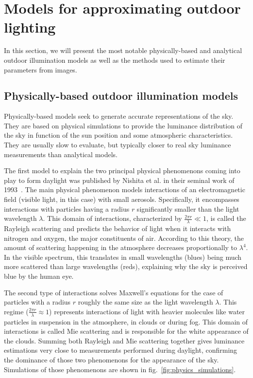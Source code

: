 

\section{Models for approximating outdoor lighting}

In this section, we will present the most notable physically-based and analytical outdoor illumination models as well as the methods used to estimate their parameters from images.


\subsection{Physically-based outdoor illumination models}

Physically-based models seek to generate accurate representations of the sky. They are based on physical simulations to provide the luminance distribution of the sky in function of the sun position and some atmospheric characteristics. They are usually slow to evaluate, but typically closer to real sky luminance measurements than analytical models.

The first model to explain the two principal physical phenomenons coming into play to form daylight was published by Nishita et al. in their seminal work of 1993~\cite{nishita1993display}. The main physical phenomenon models interactions of an electromagnetic field (visible light, in this case) with small aerosols. Specifically, it encompasses interactions with particles having a radius $r$ significantly smaller than the light wavelength $\lambda$. This domain of interactions, characterized by $\frac{2\pi r}{\lambda} \ll 1$, is called the Rayleigh scattering and predicts the behavior of light when it interacts with nitrogen and oxygen, the major constituents of air. According to this theory, the amount of scattering happening in the atmosphere decreases proportionally to $\lambda^4$. In the visible spectrum, this translates in small wavelengths (blues) being much more scattered than large wavelengths (reds), explaining why the sky is perceived blue by the human eye.

The second type of interactions solves Maxwell's equations for the case of particles with a radius $r$ roughly the same size as the light wavelength $\lambda$. This regime ($\frac{2\pi r}{\lambda} \approx 1$) represents interactions of light with heavier molecules like water particles in suspension in the atmosphere, in clouds or during fog. This domain of interactions is called Mie scattering and is responsible for the white appearance of the clouds. Summing both Rayleigh and Mie scattering together gives luminance estimations very close to measurements performed during daylight, confirming the dominance of those two phenomenons for the appearance of the sky. Simulations of those phenomenons are shown in fig.~\ref{fig:physics_simulations}.

